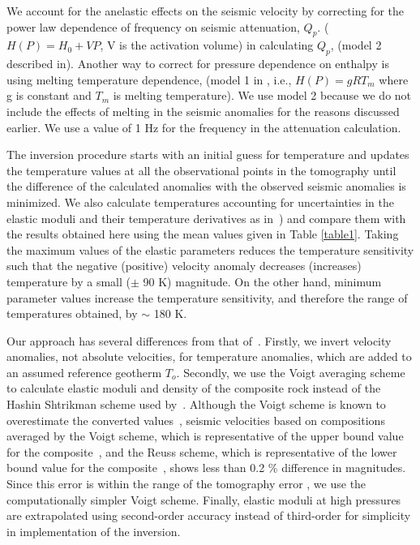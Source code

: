 \documentclass[draft,linenumbers]{agujournal2018}
\begin{document}
We account for the anelastic effects on the seismic velocity by correcting for the power law dependence of frequency on seismic attenuation, $Q_p$.  ($H(P)= H_0 + VP$, V is the activation volume) in calculating $Q_p$, (model 2 described in\citet{sobolev1996upper}). Another way to correct for pressure dependence on enthalpy is using melting temperature dependence, (model 1 in \citet{sobolev1996upper}, i.e., $H(P)= gRT_m$ where g is constant and $T_m$ is melting temperature). We use model 2 because we do not include the effects of melting in the seismic anomalies for the reasons discussed earlier. We use a value of 1 Hz for the frequency in the attenuation calculation.

The inversion procedure starts with an initial guess for temperature and updates the temperature values at all the observational points in the tomography until the difference of the calculated anomalies with the observed seismic anomalies is minimized. We also calculate temperatures accounting for uncertainties in the elastic moduli and their temperature derivatives as in~\citep{Cammarano2003}) and compare them with the results obtained here using the mean values given in Table \ref{table1}. Taking the maximum values of the elastic parameters reduces the temperature sensitivity such that the negative (positive) velocity anomaly decreases (increases) temperature by a small ($\pm$ 90 K) magnitude. On the other hand, minimum parameter values increase the temperature sensitivity, and therefore the range of temperatures obtained, by $\sim$ 180 K.

Our approach has several differences from that of~\citet{Cammarano2003}. Firstly, we invert velocity anomalies, not absolute velocities, for temperature anomalies, which are added to an assumed reference geotherm $T_o$. Secondly, we use the Voigt averaging scheme to calculate elastic moduli and density of the composite rock instead of the Hashin Shtrikman scheme used by~\citet{Cammarano2003}. Although the Voigt scheme is known to overestimate the converted values~\citep{watt_1976}, seismic velocities based on compositions averaged by the Voigt scheme, which is representative of the upper bound value for the composite~\citep{watt_1976}, and the Reuss scheme, which is representative of the  lower bound value for the composite~\citep{watt_1976}, shows less than 0.2 \% difference in magnitudes. Since this error is within the range of the tomography error \citep{Biryol_2016}, we use the computationally simpler Voigt scheme. Finally, elastic moduli at high pressures are extrapolated using second-order accuracy instead of third-order for simplicity in implementation of the inversion.
\end{document}
